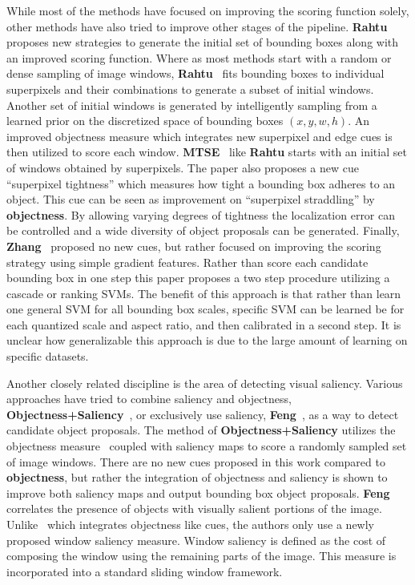 While most of the methods have focused on improving the scoring function solely, other methods have also tried to improve other stages of the pipeline. {\bf Rahtu}~\cite{Rahtu:etal:ICCV11}  proposes new strategies to generate the initial set of bounding boxes along with an improved scoring function. Where as most methods start with a random or dense sampling of image windows, {\bf Rahtu}~\cite{Rahtu:etal:ICCV11} fits bounding boxes to individual superpixels and their combinations to generate a subset of initial windows. Another set of initial windows is generated by intelligently sampling from a learned prior on the discretized space of bounding boxes \ie $(x,y,w,h)$. An improved objectness measure which integrates new superpixel and edge cues is then utilized to score each window. {\bf MTSE}~\cite{Chen:etal:CVPR15}  like {\bf Rahtu} starts with an initial set of windows obtained by superpixels.  The paper also proposes a new cue ``superpixel tightness'' which measures how tight a bounding box adheres to an object. This cue can be seen as improvement on ``superpixel straddling'' by {\bf objectness}. By allowing varying degrees of tightness the localization error can be controlled and a wide diversity of object proposals can be generated. Finally, {\bf Zhang}~\cite{Zhang:Torr:PAMI16} proposed no new cues, but rather focused on improving the scoring strategy using simple gradient features. Rather than score each candidate bounding box in one step this paper proposes a two step procedure utilizing a cascade or ranking SVMs. The benefit of this approach is that rather than learn one general SVM for all bounding box scales, specific SVM can be learned be for each quantized scale and aspect ratio, and then calibrated in a second step. It is unclear how generalizable this approach is due to the large amount of learning on specific datasets.

Another closely related discipline is the area of detecting visual saliency. Various approaches have tried to combine saliency and objectness,  {\bf Objectness+Saliency}~\cite{Chang:etal:ICCV11}, or exclusively use saliency, {\bf Feng}~\cite{Feng:etal:ICCV11}, as a way to detect candidate object proposals. The method of  {\bf Objectness+Saliency} utilizes the objectness measure~\cite{Alexe:etal:PAMI12} coupled with saliency maps to score a randomly sampled set of image windows. There are no new cues proposed in this work compared to {\bf objectness}, but rather the integration of objectness and saliency is shown to improve both saliency maps and output bounding box object proposals. {\bf Feng}  correlates the presence of objects with visually salient portions of the image. Unlike~\cite{Chang:etal:ICCV11} which integrates objectness like cues, the authors only use a newly proposed window saliency measure. Window saliency is defined as the cost of composing the window using the remaining parts of the image. This measure is incorporated into a standard sliding window framework.
   
